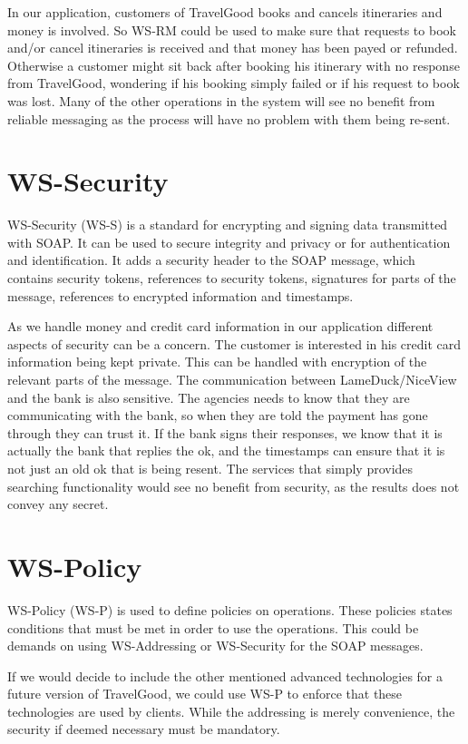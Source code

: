 In our application, customers of TravelGood books and cancels itineraries and money is involved. So WS-RM could be used to make sure that requests to book and/or cancel itineraries is received and that money has been payed or refunded. Otherwise a customer might sit back after booking his itinerary with no response from TravelGood, wondering if his booking simply failed or if his request to book was lost. Many of the other operations in the system will see no benefit from reliable messaging as the process will have no problem with them being re-sent.


\section{WS-Security}
WS-Security (WS-S) is a standard for encrypting and signing data transmitted with SOAP. It can be used to secure integrity and privacy or for authentication and identification. It adds a security header to the SOAP message, which contains security tokens, references to security tokens, signatures for parts of the message, references to encrypted information and timestamps.

As we handle money and credit card information in our application different aspects of security can be a concern. The customer is interested in his credit card information being kept private. This can be handled with encryption of the relevant parts of the message. The communication between LameDuck/NiceView and the bank is also sensitive. The agencies needs to know that they are communicating with the bank, so when they are told the payment has gone through they can trust it. If the bank signs their responses, we know that it is actually the bank that replies the ok, and the timestamps can ensure that it is not just an old ok that is being resent. The services that simply provides searching functionality would see no benefit from security, as the results does not convey any secret.

\section{WS-Policy}
WS-Policy (WS-P) is used to define policies on operations. These policies states conditions that must be met in order to use the operations. This could be demands on using WS-Addressing or WS-Security for the SOAP messages.

If we would decide to include the other mentioned advanced technologies for a future version of TravelGood, we could use WS-P to enforce that these technologies are used by clients. While the addressing is merely convenience, the security if deemed necessary must be mandatory.




